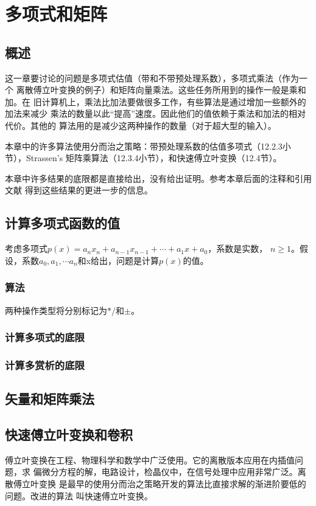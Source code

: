 \chapter{多项式和矩阵}
\section{概述}
这一章要讨论的问题是多项式估值（带和不带预处理系数），多项式乘法（作为一个
离散傅立叶变换的例子）和矩阵向量乘法。这些任务所用到的操作一般是乘和加。在
旧计算机上，乘法比加法要做很多工作，有些算法是通过增加一些额外的加法来减少
乘法的数量以此“提高”速度。因此他们的值依赖于乘法和加法的相对代价。其他的
算法用的是减少这两种操作的数量（对于超大型的输入）。

本章中的许多算法使用分而治之策略：带预处理系数的估值多项式（12.2.3小节），Strassen's
矩阵乘算法（12.3.4小节），和快速傅立叶变换（12.4节）。

本章中许多结果的底限都是直接给出，没有给出证明。参考本章后面的注释和引用文献
得到这些结果的更进一步的信息。


\section{计算多项式函数的值}
考虑多项式$p(x)=a_nx_n + a_{n-1}x_{n-1} + \cdots + a_1x + a_0$，系数是实数，
$n \geq 1$。假设，系数$a_0, a_1, \cdots a_n$和x给出，问题是计算$p(x)$的值。
\subsection{算法}
两种操作类型将分别标记为$*/$和$\pm$。



\subsection{计算多项式的底限}

\subsection{计算多赏析的底限}

\section{矢量和矩阵乘法}

\section{快速傅立叶变换和卷积}
傅立叶变换在工程、物理科学和数学中广泛使用。它的离散版本应用在内插值问题，求
偏微分方程的解，电路设计，检晶仪中，在信号处理中应用非常广泛。离散傅立叶变换
是最早的使用分而治之策略开发的算法比直接求解的渐进阶要低的问题。改进的算法
叫快速傅立叶变换。

